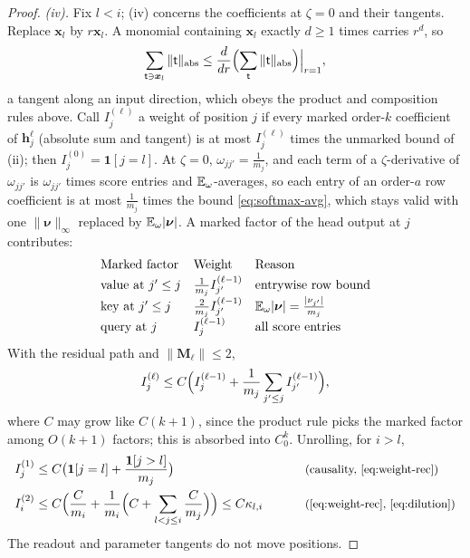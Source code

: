 \begin{proof}
\emph{(iv).} Fix $l<i$; (iv) concerns the coefficients at $\zeta=0$ and their tangents. Replace $\bm x_l$ by $r\bm x_l$. A monomial containing $\bm x_l$
exactly $d\ge1$ times carries $r^d$, so
\[
 \sum_{\mathsf t\ni\bm x_l}\|\mathsf t\|_{\mathrm{abs}}\le\frac{d}{dr}\Bigl(\sum_{\mathsf t}\|\mathsf t\|_{\mathrm{abs}}\Bigr)\Big|_{r=1},
\]
a tangent along an input direction, which obeys the product and composition rules above. Call $I^{(\ell)}_j$ a weight of position $j$ if every
marked order-$k$ coefficient of $\bm h^\ell_j$ (absolute sum and tangent) is at most $I^{(\ell)}_j$ times the unmarked bound of (ii); then
$I^{(0)}_j=\mathbf 1[j=l]$. At $\zeta=0$, $\omega_{jj'}=\frac{1}{m_j}$, and each term of a $\zeta$-derivative of $\omega_{jj'}$ is $\omega_{jj'}$ times score entries and
$\mathbb E_\omega$-averages, so each entry of an order-$a$ row coefficient is at most $\frac{1}{m_j}$ times the bound \cref{eq:softmax-avg}, which stays
valid with one $\|\bm\nu\|_\infty$ replaced by $\mathbb E_\omega|\bm\nu|$. A marked factor of the head output at $j$ contributes:
\[
\begin{array}{@{}lll@{}}
 \text{Marked factor} & \text{Weight} & \text{Reason}\\[2pt]
 \text{value at }j'\le j & \frac{1}{m_j}I^{(\ell-1)}_{j'} & \text{entrywise row bound}\\[2pt]
 \text{key at }j'\le j & \frac{2}{m_j}I^{(\ell-1)}_{j'} & \E_\omega|\bm\nu|=\frac{|\nu_{j'}|}{m_j}\\[2pt]
 \text{query at }j & I^{(\ell-1)}_j & \text{all score entries}
\end{array}
\]
With the residual path and $\|\mathbf M_\ell\|\le2$,
\begin{equation}
 I^{(\ell)}_j\le C\Bigl(I^{(\ell-1)}_j+\frac{1}{m_j}\sum_{j'\le j}I^{(\ell-1)}_{j'}\Bigr),
 \label{eq:weight-rec}
\end{equation}
where $C$ may grow like $C(k+1)$, since the product rule picks the marked factor among $O(k+1)$ factors; this is absorbed into $C_0^k$.
Unrolling, for $i>l$,
\begin{alignat*}{2}
 I^{(1)}_j&\le C\bigl(\mathbf 1[j=l]+\frac{\mathbf 1[j>l]}{m_j}\bigr) &\qquad& \why{causality, \cref{eq:weight-rec}}\\
 I^{(2)}_i&\le C\Bigl(\frac{C}{m_i}+\frac{1}{m_i}\Bigl(C+\sum_{l<j\le i}\frac{C}{m_j}\Bigr)\Bigr)\le C\kappa_{l,i} && \why{\cref{eq:weight-rec}, \cref{eq:dilution}}
\end{alignat*}
The readout and parameter tangents do not move positions.
\end{proof}

